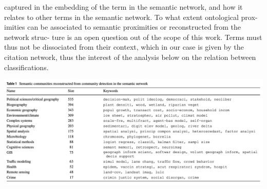 {captured in the embedding of the term in the semantic network, and how it relates to other terms in the semantic network. To what extent ontological prox- imities can be associated to semantic proximities or reconstructed from the network struc- ture is an open question out of the scope of this work. Terms must thus not be dissociated from their context, which in our case is given by the citation network, thus the interest of the analysis below on the relation between classifications.

\centering

\includegraphics[width=\linewidth]{figures/scim_Tab1.png}

}



